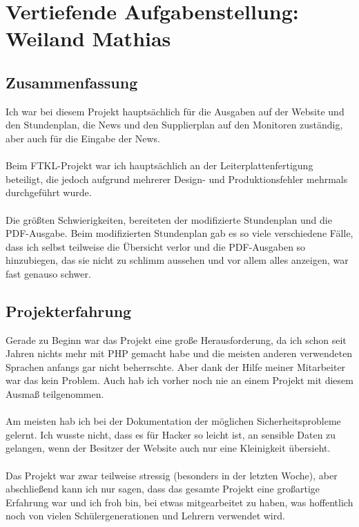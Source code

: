\chapter[Weiland]{Vertiefende Aufgabenstellung: Weiland Mathias}

\section{Zusammenfassung}
Ich war bei diesem Projekt hauptsächlich für die Ausgaben auf der Website und den Stundenplan, die News und den Supplierplan auf den Monitoren zuständig, aber auch für die Eingabe der News. \\\\
Beim FTKL-Projekt war ich hauptsächlich an der Leiterplattenfertigung beteiligt, die jedoch aufgrund mehrerer Design- und Produktionsfehler mehrmals durchgeführt wurde.\\\\
Die größten Schwierigkeiten, bereiteten der modifizierte Stundenplan und die PDF-Ausgabe. Beim modifizierten Stundenplan gab es so viele verschiedene Fälle, dass ich selbst teilweise die Übersicht verlor und die PDF-Ausgaben so hinzubiegen, das sie nicht zu schlimm aussehen und vor allem alles anzeigen, war fast genauso schwer.
\section{Projekterfahrung}
Gerade zu Beginn war das Projekt eine große Herausforderung, da ich schon seit Jahren nichts mehr mit PHP gemacht habe und die meisten anderen verwendeten Sprachen anfangs gar nicht beherrschte. Aber dank der Hilfe meiner Mitarbeiter war das kein Problem. Auch hab ich vorher noch nie an einem Projekt mit diesem Ausmaß teilgenommen.\\\\
Am meisten hab ich bei der Dokumentation der möglichen Sicherheitsprobleme gelernt. Ich wusste nicht, dass es für Hacker so leicht ist, an sensible Daten zu gelangen, wenn der Besitzer der Website auch nur eine Kleinigkeit übersieht.\\\\
Das Projekt war zwar teilweise stressig (besonders in der letzten Woche), aber abschließend kann ich nur sagen, dass das gesamte Projekt eine großartige Erfahrung war und ich froh bin, bei etwas mitgearbeitet zu haben, was hoffentlich noch von vielen Schülergenerationen und Lehrern verwendet wird.